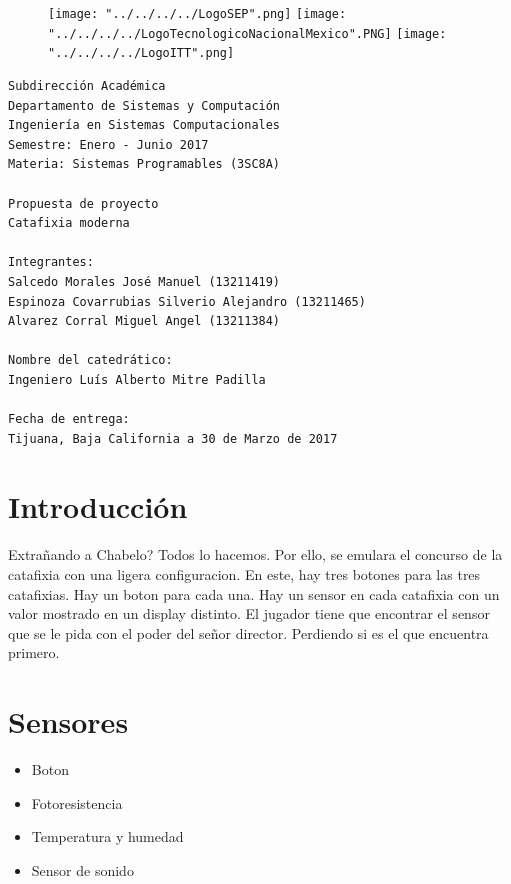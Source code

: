 \documentclass{article}
\begin{document}
\begin{figure}[!htb]
	\texttt{[image: "../../../../LogoSEP".png]}
\endminipage\hfill
{}
	\texttt{[image: "../../../../LogoTecnologicoNacionalMexico".PNG]}
\endminipage\hfill
{}
	\texttt{[image: "../../../../LogoITT".png]}
\endminipage\hfill
\end{figure}

\begingroup
\LARGE
\begin{verbatim}
Subdirección Académica
Departamento de Sistemas y Computación
Ingeniería en Sistemas Computacionales
Semestre: Enero - Junio 2017
Materia: Sistemas Programables (3SC8A)

Propuesta de proyecto
Catafixia moderna

Integrantes:
Salcedo Morales José Manuel (13211419)
Espinoza Covarrubias Silverio Alejandro (13211465)
Alvarez Corral Miguel Angel (13211384)

Nombre del catedrático:
Ingeniero Luís Alberto Mitre Padilla

Fecha de entrega:
Tijuana, Baja California a 30 de Marzo de 2017
\end{verbatim}
\endgroup

\newpage
\tableofcontents

\newpage
\section{Introducción}
Extra\~nando a Chabelo? Todos lo hacemos. Por ello, se emulara el concurso de la catafixia con una ligera configuracion.
\newline En este, hay tres botones para las tres catafixias. Hay un boton para cada una.
\newline Hay un sensor en cada catafixia con un valor mostrado en un display distinto.
El jugador tiene que encontrar el sensor que se le pida con el poder del se\~nor director. Perdiendo si es el que encuentra primero.

\section{Sensores}
\begin{itemize}
	\item Boton
	\item Fotoresistencia
	\item Temperatura y humedad
	\item Sensor de sonido
\end{itemize}
\end{document}
